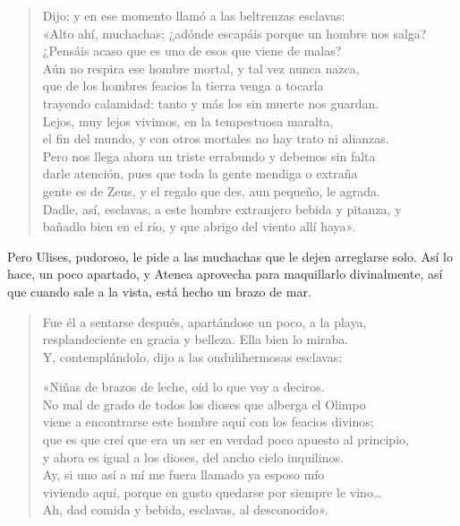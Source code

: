 \documentclass[11pt,a4paper]{article}
\begin{document}
\begin{verse}
Dijo; y en ese momento llamó a las beltrenzas esclavas:\\
«Alto ahí, muchachas; ¿adónde escapáis porque un hombre nos salga?\\
¿Pensáis acaso que es uno de esos que viene de malas?\\
Aún no respira ese hombre mortal, y tal vez nunca nazca,\\
que de los hombres feacios la tierra venga a tocarla\\
trayendo calamidad: tanto y más los sin muerte nos guardan.\\
Lejos, muy lejos vivimos, en la tempestuosa maralta,\\
el fin del mundo, y con otros mortales no hay trato ni alianzas.\\
Pero nos llega ahora un triste errabundo y debemos sin falta\\
darle atención, pues que toda la gente mendiga o extraña\\
gente es de Zeus, y el regalo que des, aun pequeño, le agrada.\\
Dadle, así, esclavas, a este hombre extranjero bebida y pitanza, y\\
bañadlo bien en el río, y que abrigo del viento allí haya».
\end{verse}

Pero Ulises, pudoroso, le pide a las muchachas que le dejen arreglarse solo. Así lo hace, un poco apartado, y Atenea aprovecha para maquillarlo divinalmente, así que cuando sale a la vista, está hecho un brazo de mar.


\begin{verse}
Fue él a sentarse después, apartándose un poco, a la playa,\\
resplandeciente en gracia y belleza. Ella bien lo miraba.\\
Y, contemplándolo, dijo a las ondulihermosas esclavas:

«Niñas de brazos de leche, oíd lo que voy a deciros.\\
No mal de grado de todos los dioses que alberga el Olimpo\\
viene a encontrarse este hombre aquí con los feacios divinos;\\
que es que creí que era un ser en verdad poco apuesto al principio,\\
y ahora es igual a los dioses, del ancho cielo inquilinos.\\
Ay, si uno así a mí me fuera llamado ya esposo mío\\
viviendo aquí, porque en gusto quedarse por siempre le vino…\\
Ah, dad comida y bebida, esclavas, al desconocido».
\end{verse}
\end{document}

